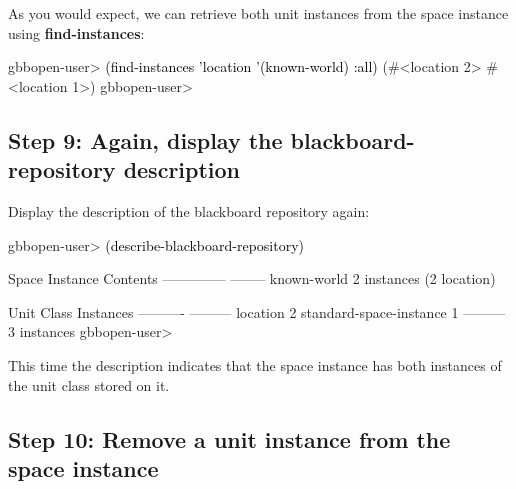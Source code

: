 \documentclass[10pt,twoside,english,pdftex]{article}
\begin{document}
%
%
As you would expect, we can retrieve both  unit instances from the
 space instance using \textbf{find-instances}:
%
\W\supp
\begin{example}
\textcolor{darkergray}{%
  gbbopen-user> \textcolor{black}{(find-instances 'location '(known-world) :all)}
  (#<location 2> #<location 1>)
  gbbopen-user>}
\end{example}

\subsection*{Step 9: Again, display the blackboard-repository description}

%
Display the description of the blackboard repository again:
%
\W\supp
\begin{example}
\textcolor{darkergray}{%
  gbbopen-user> \textcolor{black}{(describe-blackboard-repository)}
  
  Space Instance                Contents
  --------------                --------
  known-world                   2 instances (2 location)

  Unit Class                    Instances
  ----------                    ---------
  location                              2
  standard-space-instance               1
                                ---------
                                        3 instances
  gbbopen-user>}
\end{example}

This time the description indicates that the  space instance
has both instances of the  unit class stored on it.

\subsection*{Step 10:  Remove a unit instance from the space instance}
\end{document}

